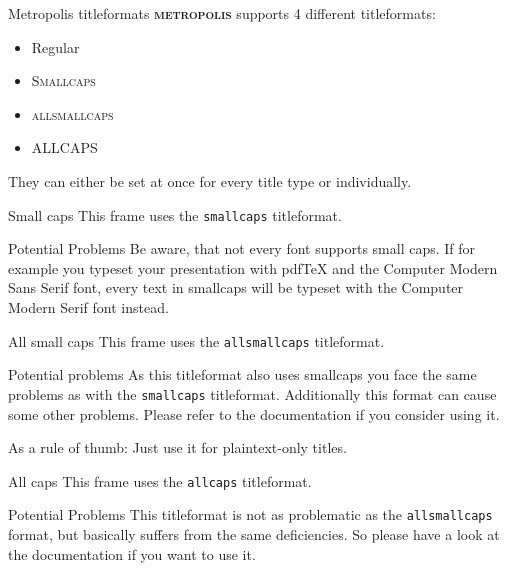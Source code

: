 \documentclass[10pt]{beamer}
\newcommand{\themename}{\textbf{\textsc{metropolis}}\xspace}
\begin{document}
\begin{frame}{Metropolis titleformats}
  \themename supports 4 different titleformats:
  \begin{itemize}
    \item Regular
    \item \textsc{Smallcaps}
    \item \textsc{allsmallcaps}
    \item ALLCAPS
  \end{itemize}
  They can either be set at once for every title type or individually.
\end{frame}

{
\begin{frame}{Small caps}
  This frame uses the \texttt{smallcaps} titleformat.

  \begin{alertblock}{Potential Problems}
    Be aware, that not every font supports small caps. If for example you typeset your presentation with pdfTeX and the Computer Modern Sans Serif font, every text in smallcaps will be typeset with the Computer Modern Serif font instead.
  \end{alertblock}
\end{frame}
}

{
\begin{frame}{All small caps}
  This frame uses the \texttt{allsmallcaps} titleformat.

  \begin{alertblock}{Potential problems}
    As this titleformat also uses smallcaps you face the same problems as with the \texttt{smallcaps} titleformat. Additionally this format can cause some other problems. Please refer to the documentation if you consider using it.

    As a rule of thumb: Just use it for plaintext-only titles.
  \end{alertblock}
\end{frame}
}

{
\begin{frame}{All caps}
  This frame uses the \texttt{allcaps} titleformat.

  \begin{alertblock}{Potential Problems}
    This titleformat is not as problematic as the \texttt{allsmallcaps} format, but basically suffers from the same deficiencies. So please have a look at the documentation if you want to use it.
  \end{alertblock}
\end{frame}
}
\end{document}

